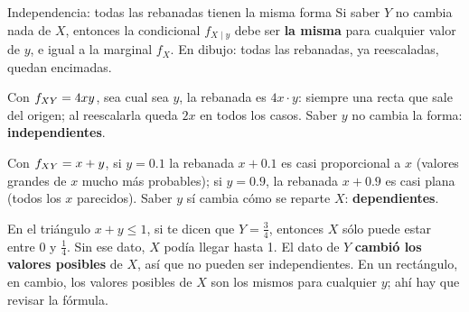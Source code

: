 \begin{afondo}{Independencia: todas las rebanadas tienen la misma forma}
Si saber $Y$ no cambia nada de $X$, entonces la condicional $f_{X\mid y}$ debe ser \textbf{la misma} para cualquier valor de
$y$, e igual a la marginal $f_X$. En dibujo: todas las rebanadas, ya reescaladas, quedan encimadas.

\begin{center}
\end{center}

Con $f_{XY}=4xy$, sea cual sea $y$, la rebanada es $4x\cdot y$: siempre una recta que sale del origen; al reescalarla queda
$2x$ en todos los casos. Saber $y$ no cambia la forma: \textbf{independientes}.

Con $f_{XY}=x+y$, si $y=0.1$ la rebanada $x+0.1$ es casi proporcional a $x$ (valores grandes de $x$ mucho más probables);
si $y=0.9$, la rebanada $x+0.9$ es casi plana (todos los $x$ parecidos). Saber $y$ sí cambia cómo se reparte $X$:
\textbf{dependientes}.

En el triángulo $x+y\le1$, si te dicen que $Y=\tfrac34$, entonces $X$ sólo puede estar entre 0 y $\tfrac14$. Sin ese dato,
$X$ podía llegar hasta 1. El dato de $Y$ \textbf{cambió los valores posibles} de $X$, así que no pueden ser independientes.
En un rectángulo, en cambio, los valores posibles de $X$ son los mismos para cualquier $y$; ahí hay que revisar la fórmula.
\end{afondo}
